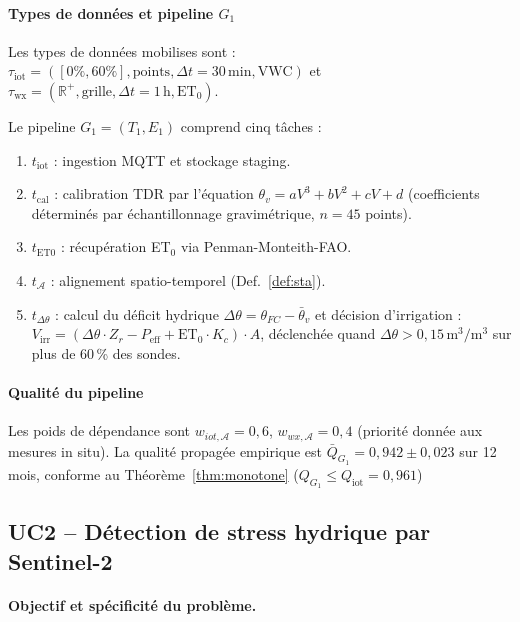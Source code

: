 \documentclass[12pt]{article}
\newcommand{\R}{\mathbb{R}}
\begin{document}
\paragraph{Types de données et pipeline $G_1$}

Les types de données mobilises sont :
$\tau_{\text{iot}} = ([0\%,60\%], \text{points}, \Delta t=30\,\text{min}, \text{VWC})$
et
$\tau_{\text{wx}} = (\R^+, \text{grille}, \Delta t=1\,\text{h}, \text{ET}_0)$.

Le pipeline $G_1 = (T_1, E_1)$ comprend cinq tâches :

\begin{enumerate}[leftmargin=1.5em,noitemsep]
	\item $t_{\text{iot}}$ : ingestion MQTT et stockage staging.
	\item $t_{\text{cal}}$ : calibration TDR par l’équation
	$\theta_v = aV^3 + bV^2 + cV + d$ (coefficients déterminés par
	échantillonnage gravimétrique, $n=45$ points).
	\item $t_{\text{ET0}}$ : récupération ET$_0$ via Penman-Monteith-FAO.
	\item $t_{\mathcal{A}}$ : alignement spatio-temporel (Def.~\ref{def:sta}).
	\item $t_{\Delta\theta}$ : calcul du déficit hydrique
	$\Delta\theta = \theta_{FC} - \bar\theta_v$ et décision
	d'irrigation :
	$V_{\text{irr}} = (\Delta\theta \cdot Z_r - P_{\text{eff}} +
	\text{ET}_0 \cdot K_c) \cdot A$,
	déclenchée quand $\Delta\theta > 0{,}15\,\text{m}^3/\text{m}^3$
	sur plus de 60\,\% des sondes.
\end{enumerate}

\paragraph{Qualité du pipeline}

Les poids de dépendance sont $w_{iot,\mathcal{A}}=0{,}6$,
$w_{wx,\mathcal{A}}=0{,}4$ (priorité donnée aux mesures in situ).
La qualité propagée empirique est
$\bar Q_{G_1} = 0{,}942 \pm 0{,}023$ sur 12 mois, conforme au
Théorème~\ref{thm:monotone} ($Q_{G_1} \leq Q_{\text{iot}} = 0{,}961$)

\subsection{UC2 -- Détection de stress hydrique par Sentinel-2}
\label{subsec:uc2}

\paragraph{Objectif et spécificité du problème.}
\end{document}
